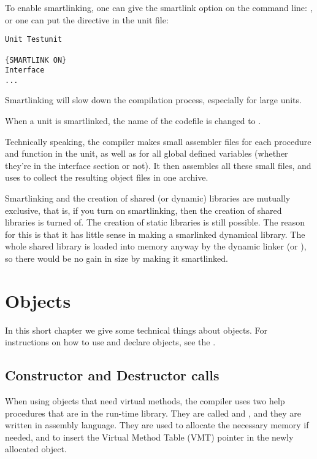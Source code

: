 To enable smartlinking, one can give the smartlink option on the command
line: , or one can put the  directive in
the unit file:
\begin{verbatim}
Unit Testunit

{SMARTLINK ON}
Interface
...
\end{verbatim}
Smartlinking will slow down the compilation process, especially for large
units.

When a unit  is smartlinked, the name of the codefile is
changed to .

Technically speaking, the compiler makes small assembler files for each
procedure and function in the unit, as well as for all global defined
variables (whether they're in the interface section or not). It then
assembles all these small files, and uses  to collect the resulting
object files in one archive.

Smartlinking and the creation of shared (or dynamic) libraries are mutually
exclusive, that is, if you turn on smartlinking, then the creation of shared
libraries is turned of. The creation of static libraries is still possible.
The reason for this is that it has little sense in making a smarlinked
dynamical library. The whole shared library is loaded into memory anyway by
the dynamic linker (or \windowsnt), so there would be no gain in size by
making it smartlinked.

\chapter{Objects}
\label{ch:Objects}
In this short chapter we give some technical things about objects. For
instructions on how to use and declare objects, see the .

\section{Constructor and Destructor calls}
\label{se:ConsDest}
When using objects that need virtual methods, the compiler uses two help
procedures that are in the run-time library. They are called
 and , and they are written in
assembly language. They are used to allocate the necessary memory if needed,
and to insert the Virtual Method Table (VMT) pointer in the newly allocated
object.

